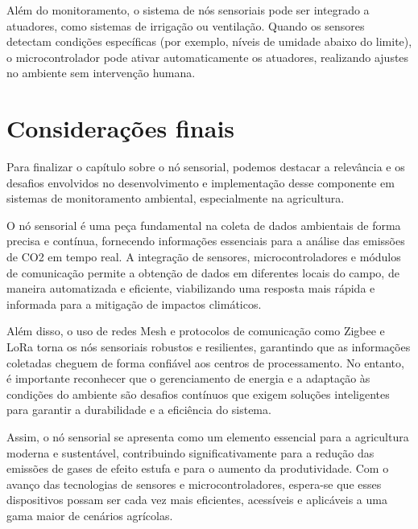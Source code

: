 Além do monitoramento, o sistema de nós sensoriais pode ser integrado a atuadores, como sistemas de irrigação ou ventilação. Quando os sensores detectam condições específicas (por exemplo, níveis de umidade abaixo do limite), o microcontrolador pode ativar automaticamente os atuadores, realizando ajustes no ambiente sem intervenção humana.

\section{Considerações finais}

Para finalizar o capítulo sobre o nó sensorial, podemos destacar a relevância e os desafios envolvidos no desenvolvimento e implementação desse componente em sistemas de monitoramento ambiental, especialmente na agricultura.

O nó sensorial é uma peça fundamental na coleta de dados ambientais de forma precisa e contínua, fornecendo informações essenciais para a análise das emissões de CO2 em tempo real. A integração de sensores, microcontroladores e módulos de comunicação permite a obtenção de dados em diferentes locais do campo, de maneira automatizada e eficiente, viabilizando uma resposta mais rápida e informada para a mitigação de impactos climáticos.

Além disso, o uso de redes Mesh e protocolos de comunicação como Zigbee e LoRa torna os nós sensoriais robustos e resilientes, garantindo que as informações coletadas cheguem de forma confiável aos centros de processamento. No entanto, é importante reconhecer que o gerenciamento de energia e a adaptação às condições do ambiente são desafios contínuos que exigem soluções inteligentes para garantir a durabilidade e a eficiência do sistema.

Assim, o nó sensorial se apresenta como um elemento essencial para a agricultura moderna e sustentável, contribuindo significativamente para a redução das emissões de gases de efeito estufa e para o aumento da produtividade. Com o avanço das tecnologias de sensores e microcontroladores, espera-se que esses dispositivos possam ser cada vez mais eficientes, acessíveis e aplicáveis a uma gama maior de cenários agrícolas.